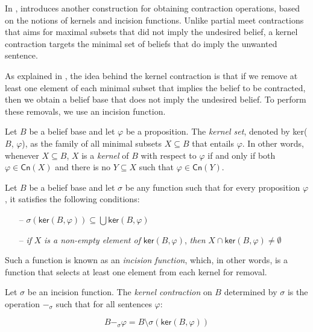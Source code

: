 In \citep{Hansson1994}, \citeauthor{Hansson1994} introduces another construction for obtaining contraction operations, based on the notions of kernels and incision functions. Unlike partial meet contractions that aims for maximal subsets that did not imply the undesired belief, a kernel contraction targets the minimal set of beliefs that do imply the unwanted sentence.

As explained in \citep{Wassermann2000}, the idea behind the kernel contraction is that if we remove at least one element of each minimal subset that implies the belief to be contracted, then we obtain a belief base that does not imply the undesired belief. To perform these removals, we use an incision function.

\begin{definition}
    Let $B$ be a belief base and let $\varphi$ be a proposition. The \textit{kernel set}, denoted by \textsf{ker}($B$, $\varphi$), as the family of all minimal subsets $X \subseteq B$ that entails $\varphi$. In other words, whenever $X \subseteq B$, $X$ is a \textit{kernel} of $B$ with respect to $\varphi$ if and only if both $\varphi \in \textsf{Cn}(X)$ and there is no $Y \subseteq X$ such that $\varphi \in \textsf{Cn}(Y)$.
\end{definition}

\begin{definition}
    Let $B$ be a belief base and let $\sigma$ be any function such that for every proposition $\varphi$, it satisfies the following conditions:
    \begin{itemize}
        \item [--] $\sigma(\textsf{ker}(B, \varphi)) \subseteq \bigcup \textsf{ker}(B, \varphi)$ 
        \item [--] \textit{if} $X$ \textit{is a non-empty element of} $\textsf{ker}(B, \varphi)$, \textit{then} $X \cap \textsf{ker}(B, \varphi) \neq \emptyset$
    \end{itemize}
    
    Such a function is known as an \textit{incision function}, which, in other words, is a function that selects at least one element from each kernel for removal.
\end{definition}

\begin{definition}
    Let $\sigma$ be an incision function. The \textit{kernel contraction} on $B$ determined by $\sigma$ is the operation $-_{\sigma}$ such that for all sentences $\varphi$:

    $$B -_{\sigma} \varphi = B \setminus \sigma(\textsf{ker}(B, \varphi))$$
\end{definition}

